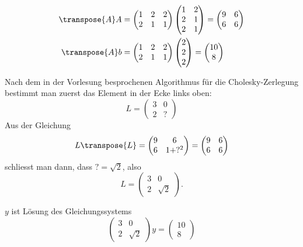 \begin{loesung}
\begin{teilaufgaben}
\item
\begin{align*}
\transpose{A}A&=
\begin{pmatrix}1&2&2\\2&1&1\end{pmatrix}
\begin{pmatrix}1&2\\2&1\\2&1\end{pmatrix}
=
\begin{pmatrix}
9&6\\
6&6
\end{pmatrix}
\\
\transpose{A}b&=
\begin{pmatrix}1&2&2\\2&1&1\end{pmatrix}
\begin{pmatrix}2\\2\\2\end{pmatrix}
=
\begin{pmatrix}
10\\8
\end{pmatrix}
\end{align*}
\item Nach dem in der Vorlesung besprochenen Algorithmus für die
Cholesky-Zerlegung bestimmt man zuerst das Element in der Ecke
links oben:
\[
L=\begin{pmatrix}
3&0\\
2&?
\end{pmatrix}
\]
Aus der Gleichung
\[
L\transpose{L}
=
\begin{pmatrix}9&6\\6&1+?^2\end{pmatrix}=\begin{pmatrix}9&6\\6&6\end{pmatrix}
\]
schliesst man dann, dass $?=\sqrt{2}$, also
\[
L=\begin{pmatrix}
3&0\\2&\sqrt{2}
\end{pmatrix}.
\]
\item $y$ ist Lösung des Gleichungssystems
\[
\begin{pmatrix}
3&0\\
2&\sqrt{2}
\end{pmatrix}y=\begin{pmatrix}10\\8\end{pmatrix}
\]
\end{teilaufgaben}
\end{loesung}

